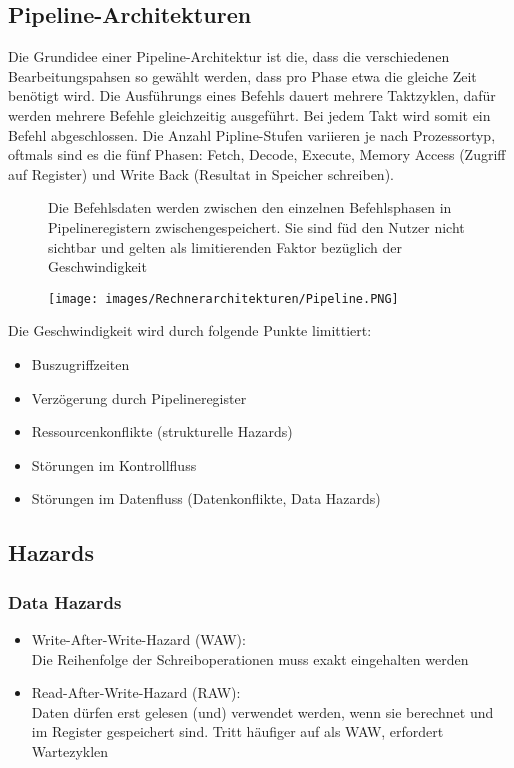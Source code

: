 \subsection{Pipeline-Architekturen}
Die Grundidee einer Pipeline-Architektur ist die, dass die verschiedenen Bearbeitungspahsen so gewählt werden, dass pro Phase etwa die gleiche Zeit benötigt wird.
Die Ausführungs eines Befehls dauert mehrere Taktzyklen, dafür werden mehrere Befehle gleichzeitig ausgeführt.
Bei jedem Takt wird somit ein Befehl abgeschlossen.
Die Anzahl Pipline-Stufen variieren je nach Prozessortyp, oftmals sind es die fünf Phasen: Fetch, Decode, Execute, Memory Access (Zugriff auf Register) und Write Back (Resultat in Speicher schreiben).
\begin{figure}[htbp]
	
	\begin{minipage}{0.5\textwidth}
		Die Befehlsdaten werden zwischen den einzelnen Befehlsphasen in Pipelineregistern zwischengespeichert. Sie sind füd den Nutzer nicht sichtbar und gelten als limitierenden Faktor bezüglich der Geschwindigkeit		
		
	\end{minipage}
	\hfill		
	\begin{minipage}{0.45\textwidth} 
		\texttt{[image: images/Rechnerarchitekturen/Pipeline.PNG]}
	\end{minipage}
	
\end{figure}
\vspace{-0.5cm}
Die Geschwindigkeit wird durch folgende Punkte limittiert:
\begin{itemize}[noitemsep,topsep=0pt]
	\item Buszugriffzeiten
	\item Verzögerung durch Pipelineregister
	\item Ressourcenkonflikte (strukturelle Hazards)
	\item Störungen im Kontrollfluss
	\item Störungen im Datenfluss (Datenkonflikte, Data Hazards)
\end{itemize}

\subsection{Hazards}
\subsubsection{Data Hazards}
\begin{itemize}[noitemsep,topsep=0pt]
	\item Write-After-Write-Hazard (WAW):\\
	Die Reihenfolge der Schreiboperationen muss exakt eingehalten werden
	\item Read-After-Write-Hazard (RAW):\\
	Daten dürfen erst gelesen (und) verwendet werden, wenn sie berechnet und im Register gespeichert sind. Tritt häufiger auf als WAW, erfordert Wartezyklen
\end{itemize}

